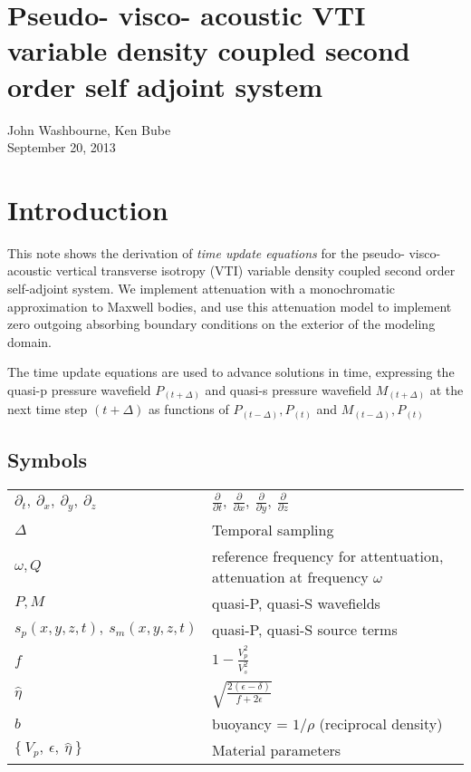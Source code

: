 \documentclass[10pt,fleqn]{article}
\begin{document}
\section{Pseudo- visco- acoustic VTI variable density coupled second order self adjoint system}
John Washbourne, Ken Bube\\
September 20, 2013

\section{Introduction}
This note shows the derivation of \textit{time update equations} for the pseudo- visco-
acoustic vertical transverse isotropy (VTI) variable density coupled second order self-adjoint
system. We implement attenuation with a monochromatic approximation to Maxwell bodies, and use
this attenuation model to implement zero outgoing absorbing boundary conditions on the exterior
of the modeling domain.
\vspace{10pt}

The time update equations are used to advance solutions in time, expressing the quasi-p
pressure wavefield $P_{(t + \Delta)}$ and quasi-s pressure wavefield $M_{(t + \Delta)}$
at the next time step $(t + \Delta)$ as functions of $P_{(t - \Delta)}, P_{(t)}$ and $M_{(t - \Delta)}, P_{(t)}$

\subsection{Symbols}
\begin{center}
\begin{tabular}{ll} \\[-10pt]
$\partial_t,\ \partial_x,\ \partial_y,\ \partial_z$ & $ 
\displaystyle \frac{\partial }{\partial t},\ 
\displaystyle \frac{\partial }{\partial x},\ 
\displaystyle \frac{\partial }{\partial y},\ 
\displaystyle \frac{\partial }{\partial z} $ \\[15pt]
$\Delta$ & Temporal sampling \\[15pt]
$\omega, Q$ & reference frequency for attentuation, attenuation at frequency $\omega$ \\[10pt]
$P, M$ & quasi-P, quasi-S wavefields\\[10pt]
$s_p(x,y,z,t),\ s_m(x,y,z,t)$ & quasi-P, quasi-S source terms\\[10pt]
$f$ & $ 1 - \displaystyle \frac{V_p^2}{V_s^2} $\\[10pt]
$ \widehat{\eta} $ & $ \sqrt{ \displaystyle \frac{2 \left(\epsilon - \delta\right) }{f + 2 \epsilon } } $\\[10pt]
$b$ & buoyancy = $\displaystyle 1/\rho $ (reciprocal density) \\[10pt]
$ \{\ V_p,\ \epsilon,\ \widehat{\eta}\ \} $ & Material parameters \\[10pt]
\end{tabular}
\end{center}
\end{document}
